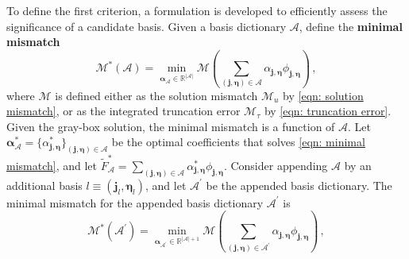 To define the first criterion, 
a formulation is developed to efficiently assess the significance of a candidate basis.
Given a basis dictionary $\mathcal{A}$, define the \textbf{minimal mismatch}
\begin{equation}
    \mathcal{M}^*(\mathcal{A}) = \min_{\boldsymbol{\alpha}_\mathcal{A} \in \mathbb{R}^{|\mathcal{A}|}}
    \mathcal{M}\left( \sum_{(\boldsymbol{j}, \boldsymbol{\eta})\in \mathcal{A}}
    {\alpha}_{\boldsymbol{j}, \boldsymbol{\eta}} {\phi}_{\boldsymbol{j}, 
    \boldsymbol{\eta}} \right)\,,
    \label{eqn: minimal mismatch}
\end{equation}
where $\mathcal{M}$ is defined either as the solution mismatch $\mathcal{M}_u$ by 
\eqref{eqn: solution mismatch}, or as the integrated truncation error 
$\mathcal{M}_{\tau}$ by \eqref{eqn: truncation error}.
Given the gray-box solution, the minimal mismatch 
is a function of $\mathcal{A}$.
Let $\boldsymbol{\alpha}_{\mathcal{A}}^* =\{\alpha_{\boldsymbol{j}, \boldsymbol{\eta}}^*\}_{
(\boldsymbol{j}, \boldsymbol{\eta})\in \mathcal{A}}$
be the optimal coefficients that solves \eqref{eqn: minimal mismatch}, and let
$\tilde{F}^*_\mathcal{A} = \sum_{(\boldsymbol{j}, \boldsymbol{\eta})\in \mathcal{A}} 
\alpha^*_{\boldsymbol{j}, \boldsymbol{\eta}} \phi_{\boldsymbol{j}, \boldsymbol{\eta}}$.
Consider appending $\mathcal{A}$ 
by an additional basis
$l\equiv \left(\boldsymbol{j}_l, \boldsymbol{\eta}_l\right)$, 
and let 
$\mathcal{A}^\prime$ be the appended basis dictionary.
The minimal mismatch for the appended basis dictionary
$\mathcal{A}^\prime$ is
\begin{equation}
    \mathcal{M}^*(\mathcal{A}^\prime) 
    = \min_{\boldsymbol{\alpha}_{\mathcal{A}^\prime} \in \mathbb{R}^{|\mathcal{A}|+1}}
    \mathcal{M}\left( \sum_{(\boldsymbol{j}, \boldsymbol{\eta})\in \mathcal{A}^\prime}
    {\alpha}_{\boldsymbol{j}, \boldsymbol{\eta}} {\phi}_{\boldsymbol{j}, \boldsymbol{\eta}} 
    \right)\,,
    \label{eqn: append minimal mismatch}
\end{equation}
